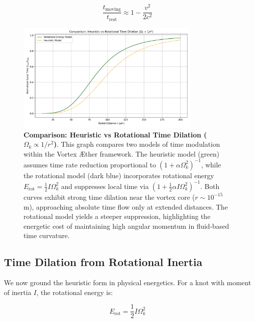 \begin{equation}
\frac{t_{\text{moving}}}{t_{\text{rest}}} \approx 1 - \frac{v^2}{2 c^2}\label{eq:lorentz_time_dilation}
\end{equation}

\begin{figure}[htbp]
    \centering
    \includegraphics[width=0.8\textwidth]{RotationalVsHeuristicTimeDilation}
    \caption{\textbf{Comparison: Heuristic vs Rotational Time Dilation (\(\Omega_k \propto 1/r^2\))}.
    This graph compares two models of time modulation within the Vortex Æther framework.
    The heuristic model (green) assumes time rate reduction proportional to \((1 + \alpha \Omega_k^2)^{-1}\),
        while the rotational model (dark blue) incorporates rotational energy \(E_{\text{rot}} = \frac{1}{2} I \Omega_k^2\) and suppresses local time via
        \((1 + \frac{1}{2} \alpha I \Omega_k^2)^{-1}\). Both curves exhibit strong time dilation near the vortex core (\(r \sim 10^{-15}\) m),
        approaching absolute time flow only at extended distances. The rotational model yields a steeper suppression,
        highlighting the energetic cost of maintaining high angular momentum in fluid-based time curvature.
    }
    \label{fig:radial_time_profile}
\end{figure}

\subsection{Time Dilation from Rotational Inertia}

We now ground the heuristic form in physical energetics. For a knot with moment of inertia $I$, the rotational energy is:

\begin{equation}
E_{\text{rot}} = \frac{1}{2} I \Omega_k^2\label{eq:rotational_energy}
\end{equation}

